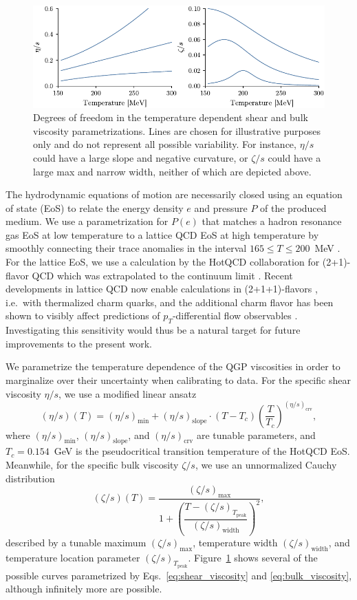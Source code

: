 \documentclass[aps,prc,reprint,amsmath,nofootinbib]{revtex4-1}
\newcommand{\Tc}{T_c}
\newcommand{\smin}{{(\eta/s)_\mathrm{min}}}
\newcommand{\sslope}{{(\eta/s)_\mathrm{slope}}}
\newcommand{\scrv}{{(\eta/s)_\mathrm{crv}}}
\newcommand{\bmax}{{(\zeta/s)_\mathrm{max}}}
\newcommand{\bwidth}{{(\zeta/s)_\mathrm{width}}}
\newcommand{\bloc}{{(\zeta/s)_{T_\mathrm{peak}}}}
\begin{document}
\begin{figure}[t]
  \includegraphics{viscosity_dof}
  \caption{
    \label{fig:viscosity_dof}
    Degrees of freedom in the temperature dependent shear and bulk viscosity parametrizations. Lines are chosen for illustrative purposes only and do not represent all possible variability.
    For instance, $\eta/s$ could have a large slope and negative curvature, or $\zeta/s$ could have a large max and narrow width, neither of which are depicted above.
  }
\end{figure}

The hydrodynamic equations of motion are necessarily closed using an equation of state (EoS) to relate the energy density $e$ and pressure $P$ of the produced medium.
We use a parametrization for $P(e)$ that matches a hadron resonance gas EoS at low temperature to a lattice QCD EoS at high temperature by smoothly connecting their trace anomalies in the interval $165 \le T \le 200$~MeV \cite{Bernhard:2018hnz}.
For the lattice EoS, we use a calculation by the HotQCD collaboration for (2+1)-flavor QCD which was extrapolated to the continuum limit \cite{Bazavov:2014pvz}.
Recent developments in lattice QCD now enable calculations in (2+1+1)-flavors \cite{Borsanyi:2016ksw}, i.e.\ with thermalized charm quarks, and the additional charm flavor has been shown to visibly affect predictions of $p_T$-differential flow observables \cite{Noronha-Hostler:2018zxc}.
Investigating this sensitivity would thus be a natural target for future improvements to the present work.

We parametrize the temperature dependence of the QGP viscosities in order to marginalize over their uncertainty when calibrating to data.
For the specific shear viscosity $\eta/s$, we use a modified linear ansatz
\begin{equation}
  \label{eq:shear_viscosity}
(\eta/s)(T) = \smin + \sslope \cdot (T - \Tc) \left ( \frac{T}{\Tc} \right)^\scrv,
\end{equation}
where $\smin$, $\sslope$, and $\scrv$ are tunable parameters, and $\Tc=0.154$~GeV is the pseudocritical transition temperature of the HotQCD EoS.
Meanwhile, for the specific bulk viscosity $\zeta/s$, we use an unnormalized Cauchy distribution
\begin{equation}
  \label{eq:bulk_viscosity}
  (\zeta/s)(T) = \frac{\bmax}{1 + \left(\dfrac{T - \bloc}{\bwidth}\right)^2},
\end{equation}
described by a tunable maximum $\bmax$, temperature width $\bwidth$, and temperature location parameter $\bloc$.
Figure~\ref{fig:viscosity_dof} shows several of the possible curves parametrized by Eqs.~\eqref{eq:shear_viscosity} and \eqref{eq:bulk_viscosity}, although infinitely more are possible.
\end{document}
